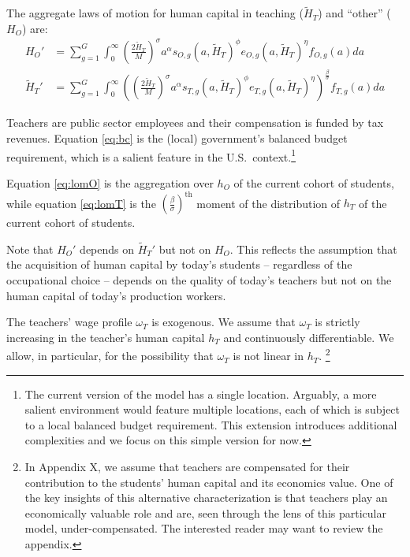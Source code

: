 \documentclass[onehalfspacing,11pt]{article}
\begin{document}
	The aggregate laws of motion for human capital in teaching ($\widetilde{H}_T$) and ``other'' (${H}_O$) are:
	\begin{align}
		\label{eq:lomO}
		{H}_{O}' & = \sum_{g=1}^G \int_0^\infty \left(\tfrac{2 \widetilde{H}_T}{M}\right)^\sigma a^\alpha s_{O,g}\left(a,\widetilde{H}_T\right)^\phi e_{O,g}(a,\widetilde{H}_T)^\eta  f_{O,g}(a) da \\
		\label{eq:lomT}
		\widetilde{H}_{T}' & = \sum_{g=1}^G \int_0^\infty \left(\left(\tfrac{2 \widetilde{H}_T}{M}\right)^\sigma a^\alpha s_{T,g}\left(a,\widetilde{H}_T\right)^\phi e_{T,g}(a,\widetilde{H}_T)^\eta \right)^{\frac{\beta}{\sigma}} f_{T,g}(a) da 
	\end{align}
	
	Teachers are public sector employees and their compensation is funded by tax revenues. Equation \eqref{eq:bc} is the (local) government's balanced budget requirement, which is a salient feature in the U.S.~context.\footnote{The current version of the model has a single location. Arguably, a more salient environment would feature multiple locations, each of which is subject to a local balanced budget requirement. This extension introduces additional complexities and we focus on this simple version for now.}
	
	Equation \eqref{eq:lomO} is the aggregation over $h_O$ of the current cohort of students, while equation \eqref{eq:lomT} is the ${\left( \tfrac{\beta}{\sigma} \right)}^{\textrm{th}}$ moment of the distribution of $h_T$ of the current cohort of students.
	
	Note that ${H}_{O}'$ depends on $\widetilde{H}_{T}' $ but not on ${H}_{O}$. This reflects the assumption that the acquisition of human capital by today's students -- regardless of the occupational choice -- depends on the quality of today's teachers but not on the human capital of today's production workers.
	
	The teachers' wage profile $\omega_T$ is exogenous. We assume that $\omega_T$ is strictly increasing in the teacher's human capital $h_T$ and continuously differentiable. We allow, in particular, for the possibility that $\omega_T$ is not linear in $h_T$.%
	\footnote{In Appendix X, we assume that teachers are compensated for their contribution to the students' human capital and its economics value. One of the key insights of this alternative characterization is that teachers play an economically valuable role and are, seen through the lens of this particular model, under-compensated. The interested reader may want to review the appendix.}
\end{document}
